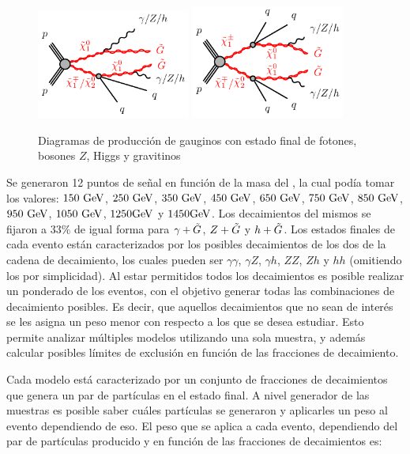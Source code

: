 \begin{figure}
  \centering
  \includegraphics[width=0.45\textwidth]{images/N1N2C1-qqZhphGG-GGM.pdf}%
  \includegraphics[width=0.45\textwidth]{images/C1C1N2-qqqqZhphGG-GGM.pdf}
  \caption{Diagramas de producción de gauginos con estado final de fotones, bosones $Z$, Higgs y gravitinos}
  \label{fig:EWK_GGM_diagrams}
\end{figure}


Se generaron 12 puntos de señal en función de la masa del \ninoone, la cual podía tomar los valores: $150\ \text{GeV}$, $250\ \text{GeV}$, $350\ \text{GeV}$, $450\ \gev$, $650\ \text{GeV}$, $750\ \text{GeV}$, $850\ \gev$, $950\ \text{GeV}$, $1050\ \text{GeV}$, $1250 \text{GeV}$ y $1450 \text{GeV}$. Los decaimientos del mismos se fijaron a $33\%$ de igual forma para $\gamma + \tilde{G}$, $Z + \tilde{G}$ y $h + \tilde{G}$. Los estados finales de cada evento están caracterizados por los posibles decaimientos de los dos \ninoone de la cadena de decaimiento, los cuales pueden ser $\gamma\gamma$, $\gamma Z$, $\gamma h$, $ZZ$, $Zh$ y $hh$ (omitiendo los \gravino por simplicidad). Al estar permitidos todos los decaimientos es posible realizar un ponderado de los eventos, con el objetivo generar todas las combinaciones de decaimiento posibles. Es decir, que aquellos decaimientos que no sean de interés se les asigna un peso menor con respecto a los que se desea estudiar. Esto permite analizar múltiples modelos utilizando una sola muestra, y además calcular posibles límites de exclusión en función de las fracciones de decaimiento.

Cada modelo está caracterizado por un conjunto de fracciones de decaimientos que genera un par de partículas en el estado final. A nivel generador de las muestras es posible saber cuáles partículas se generaron y aplicarles un peso al evento dependiendo de eso. El peso que se aplica a cada evento, dependiendo del par de partículas producido y en función de las fracciones de decaimientos es:



